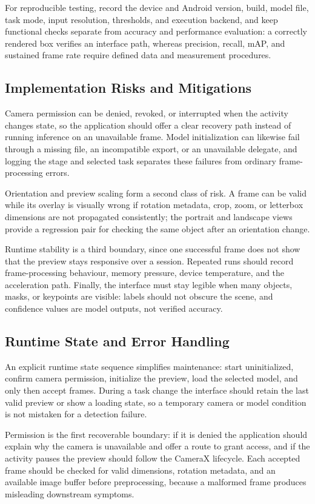 For reproducible testing, record the device and Android version, build, model file, task mode, input
resolution, thresholds, and execution backend, and keep functional checks separate from accuracy and
performance evaluation: a correctly rendered box verifies an interface path, whereas precision,
recall, mAP, and sustained frame rate require defined data and measurement procedures.

\subsection{Implementation Risks and Mitigations}
Camera permission can be denied, revoked, or interrupted when the activity changes state, so the
application should offer a clear recovery path instead of running inference on an unavailable frame.
Model initialization can likewise fail through a missing file, an incompatible export, or an
unavailable delegate, and logging the stage and selected task separates these failures from ordinary
frame-processing errors.

Orientation and preview scaling form a second class of risk. A frame can be valid while its overlay is
visually wrong if rotation metadata, crop, zoom, or letterbox dimensions are not propagated
consistently; the portrait and landscape views provide a regression pair for checking the same object
after an orientation change.

Runtime stability is a third boundary, since one successful frame does not show that the preview stays
responsive over a session. Repeated runs should record frame-processing behaviour, memory pressure,
device temperature, and the acceleration path. Finally, the interface must stay legible when many
objects, masks, or keypoints are visible: labels should not obscure the scene, and confidence values
are model outputs, not verified accuracy.

\subsection{Runtime State and Error Handling}
An explicit runtime state sequence simplifies maintenance: start uninitialized, confirm camera
permission, initialize the preview, load the selected model, and only then accept frames. During a
task change the interface should retain the last valid preview or show a loading state, so a temporary
camera or model condition is not mistaken for a detection failure.

Permission is the first recoverable boundary: if it is denied the application should explain why the
camera is unavailable and offer a route to grant access, and if the activity pauses the preview should
follow the CameraX lifecycle. Each accepted frame should be checked for valid dimensions, rotation
metadata, and an available image buffer before preprocessing, because a malformed frame produces
misleading downstream symptoms.

